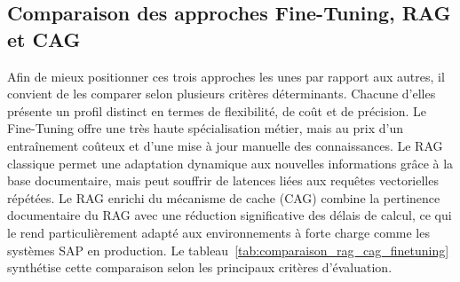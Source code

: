 \subsection{Comparaison des approches Fine-Tuning, RAG et CAG}

Afin de mieux positionner ces trois approches les unes par rapport aux autres, il convient de les comparer selon plusieurs critères déterminants. Chacune d’elles présente un profil distinct en termes de flexibilité, de coût et de précision. Le Fine-Tuning offre une très haute spécialisation métier, mais au prix d’un entraînement coûteux et d’une mise à jour manuelle des connaissances. Le RAG classique permet une adaptation dynamique aux nouvelles informations grâce à la base documentaire, mais peut souffrir de latences liées aux requêtes vectorielles répétées. Le RAG enrichi du mécanisme de cache (CAG) combine la pertinence documentaire du RAG avec une réduction significative des délais de calcul, ce qui le rend particulièrement adapté aux environnements à forte charge comme les systèmes SAP en production. Le tableau~\ref{tab:comparaison_rag_cag_finetuning} synthétise cette comparaison selon les principaux critères d’évaluation.

\begin{table}[H]
\centering
\renewcommand{\arraystretch}{1.4}
\caption{Comparaison entre Fine-Tuning, RAG et RAG+CAG}
\label{tab:comparaison_rag_cag_finetuning}
\end{table}
